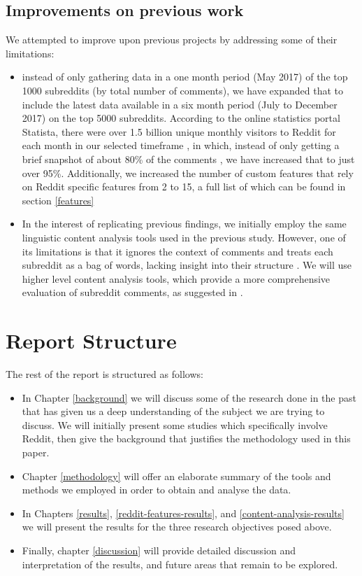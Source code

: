 \documentclass[bsc,frontabs,twoside,singlespacing,parskip,deptreport]{infthesis}
\begin{document}
\subsection{Improvements on previous work}

We attempted to improve upon previous projects by addressing some of their limitations:
\begin{itemize}
	\item instead of only gathering data in a one month period (May 2017) of the top 1000 subreddits (by total number of comments), we have expanded that to include the latest data available in a six month period (July to December 2017) on the top 5000 subreddits. According to the online statistics portal Statista, there were over 1.5 billion unique monthly visitors to Reddit for each month in our selected timeframe \cite{statista}, in which, instead of only getting a brief snapshot of about 80\% of the comments \cite{masters}, we have increased that to just over 95\%. Additionally, we increased the number of custom features that rely on Reddit specific features from 2 to 15, a full list of which can be found in section \ref{features}
	\item In the interest of replicating previous findings, we initially employ the same linguistic content analysis tools used in the previous study. However, one of its limitations is that it ignores the context of comments and treats each subreddit as a bag of words, lacking insight into their structure \cite{masters}. We will use higher level content analysis tools, which provide a more comprehensive evaluation of subreddit comments, as suggested in \cite{lowe2002software}.
\end{itemize}

\section{Report Structure}
The rest of the report is structured as follows:
\begin{itemize}
	\item In Chapter \ref{background} we will discuss some of the research done in the past that has given us a deep understanding of the subject we are trying to discuss. We will initially present some studies which specifically involve Reddit, then give the background that justifies the methodology used in this paper.
	\item Chapter \ref{methodology} will offer an elaborate summary of the tools and methods we employed in order to obtain and analyse the data.
	\item In Chapters \ref{results}, \ref{reddit-features-results}, and \ref{content-analysis-results} we will present the results for the three research objectives posed above.
	\item Finally, chapter \ref{discussion} will provide detailed discussion and interpretation of the results, and future areas that remain to be explored.
\end{itemize}
\end{document}
